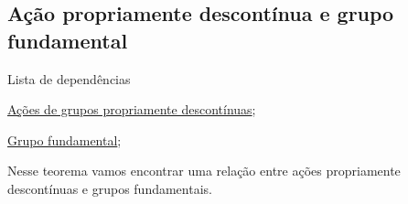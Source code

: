 \subsection{Ação propriamente descontínua e grupo fundamental} %
\label{ações-de-grupos-e-gr-fundamental-prop}
\begin{titlemize}{Lista de dependências}
	\item \hyperref[ações-de-grupos-propriamente-descontínuas-def]{Ações de grupos propriamente descontínuas};\\ %
	\item \hyperref[grupo-fundamental-def]{Grupo fundamental};\\
\end{titlemize}
Nesse teorema vamos encontrar uma relação entre ações propriamente descontínuas e grupos fundamentais.

